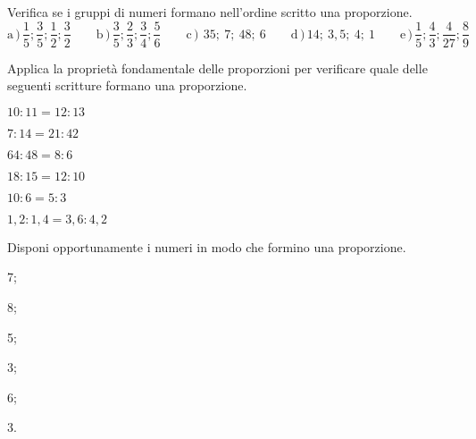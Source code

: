 \subsubsection*{}

\begin{esercizio}
 \label{ese:3.115}
Verifica se i gruppi di numeri formano nell'ordine scritto una proporzione.
\[
\text{a}\,)\,\frac{1}{5}; \frac{3}{5}; \frac{1}{2}; \frac{3}{2}\qquad
\text{b}\,)\,\frac{3}{5}; \frac{2}{3}; \frac{3}{4}; \frac{5}{6}\qquad
\text{c}\,)\,~35;~7;~48;~6\qquad
\text{d}\,)\,14;~3,5;~4;~1\qquad
\text{e}\,)\,\frac{1}{5}; \frac{4}{3}; \frac{4}{27}; \frac{8}{9}
\]
\end{esercizio}

\begin{esercizio}
 \label{ese:3.116}
 Applica la proprietà fondamentale delle proporzioni per verificare quale 
 delle seguenti scritture formano una proporzione.
\begin{multicols}{2}
 \TabPositions{4cm}
 \begin{enumeratea}
 \item \(10:11 =12:13\) \tab\quad\boxSi\quad\boxNo
 \item \(7:14 =21:42\) \tab\quad\boxSi\quad\boxNo
 \item \(64:48 =8:6\) \tab\quad\boxSi\quad\boxNo
 \item \(18:15 =12:10\) \tab\quad\boxSi\quad\boxNo
 \item \(10:6 =5:3\) \tab\quad\boxSi\quad\boxNo
 \item \(1,2:1,4 =3,6:4,2\) \tab\quad\boxSi\quad\boxNo
 \end{enumeratea}
 \end{multicols}
\end{esercizio}

\begin{esercizio}
 \label{ese:3.117}
Disponi opportunamente i numeri in modo che formino una proporzione.
\begin{multicols}{2}
\begin{enumeratea}
\item 7;
\item 8;
\item 5;
\item 3;
\item 6;
\item 3.
\end{enumeratea}
 \end{multicols}
\end{esercizio}

